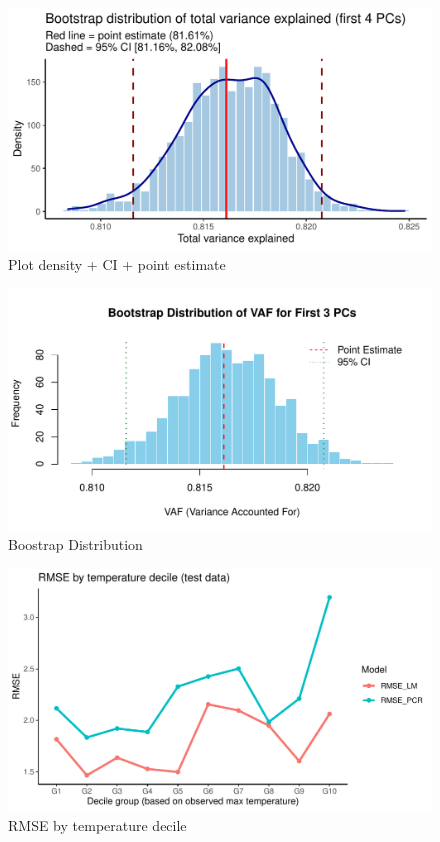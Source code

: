 \documentclass[
]{article}
\begin{document}
\begin{figure}[H]

{\centering \includegraphics[width=0.8\linewidth]{Assignment2_Group9_files/figure-latex/unnamed-chunk-9-1} 

}

\caption{Plot density + CI + point estimate}\label{fig:unnamed-chunk-9}
\end{figure}

\begin{figure}[H]

{\centering \includegraphics[width=0.8\linewidth]{Assignment2_Group9_files/figure-latex/unnamed-chunk-10-1} 

}

\caption{Boostrap Distribution}\label{fig:unnamed-chunk-10}
\end{figure}

\begin{figure}[H]

{\centering \includegraphics[width=0.8\linewidth]{Assignment2_Group9_files/figure-latex/unnamed-chunk-11-1} 

}

\caption{RMSE by temperature decile}\label{fig:unnamed-chunk-11}
\end{figure}
\end{document}
